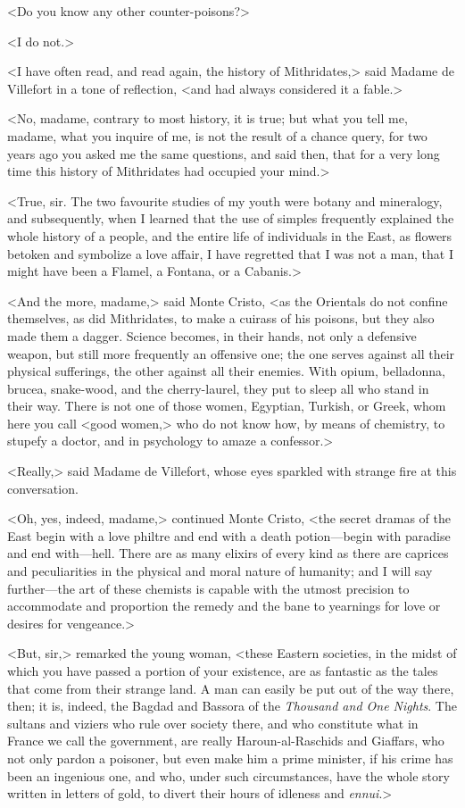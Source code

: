  <Do you know any other counter-poisons?> 

 <I do not.> 

 <I have often read, and read again, the history of Mithridates,> said Madame de Villefort in a tone of reflection, <and had always considered it a fable.> 

 <No, madame, contrary to most history, it is true; but what you tell me, madame, what you inquire of me, is not the result of a chance query, for two years ago you asked me the same questions, and said then, that for a very long time this history of Mithridates had occupied your mind.> 

 <True, sir. The two favourite studies of my youth were botany and mineralogy, and subsequently, when I learned that the use of simples frequently explained the whole history of a people, and the entire life of individuals in the East, as flowers betoken and symbolize a love affair, I have regretted that I was not a man, that I might have been a Flamel, a Fontana, or a Cabanis.> 

 <And the more, madame,> said Monte Cristo, <as the Orientals do not confine themselves, as did Mithridates, to make a cuirass of his poisons, but they also made them a dagger. Science becomes, in their hands, not only a defensive weapon, but still more frequently an offensive one; the one serves against all their physical sufferings, the other against all their enemies. With opium, belladonna, brucea, snake-wood, and the cherry-laurel, they put to sleep all who stand in their way. There is not one of those women, Egyptian, Turkish, or Greek, whom here you call <good women,> who do not know how, by means of chemistry, to stupefy a doctor, and in psychology to amaze a confessor.> 

 <Really,> said Madame de Villefort, whose eyes sparkled with strange fire at this conversation. 

 <Oh, yes, indeed, madame,> continued Monte Cristo, <the secret dramas of the East begin with a love philtre and end with a death potion—begin with paradise and end with—hell. There are as many elixirs of every kind as there are caprices and peculiarities in the physical and moral nature of humanity; and I will say further—the art of these chemists is capable with the utmost precision to accommodate and proportion the remedy and the bane to yearnings for love or desires for vengeance.> 

 <But, sir,> remarked the young woman, <these Eastern societies, in the midst of which you have passed a portion of your existence, are as fantastic as the tales that come from their strange land. A man can easily be put out of the way there, then; it is, indeed, the Bagdad and Bassora of the \textit{Thousand and One Nights}. The sultans and viziers who rule over society there, and who constitute what in France we call the government, are really Haroun-al-Raschids and Giaffars, who not only pardon a poisoner, but even make him a prime minister, if his crime has been an ingenious one, and who, under such circumstances, have the whole story written in letters of gold, to divert their hours of idleness and \textit{ennui}.> 

